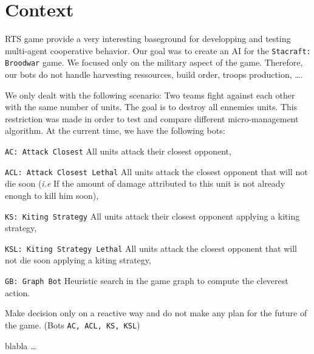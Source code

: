 \section{Context}

RTS game provide a very interesting baseground for developping and testing multi-agent cooperative behavior.
Our goal was to create an AI for the \texttt{Stacraft: Broodwar} game. We focused only on the military aspect of the game. Therefore, our bots do not handle harvesting ressources, build order, troops production, \ldots.

We only dealt with the following scenario: Two teams fight against each other with the same number of units. The goal is to destroy all ennemies units.
This restriction was made in order to test and compare different micro-management algorithm. 
At the current time, we have the following bots:
\begin{shortitem}
\item \texttt{AC: Attack Closest} All units attack their closest opponent,
\item \texttt{ACL: Attack Closest Lethal} All units attack the closest opponent that will not die soon (\emph{i.e} If the amount of damage attributed to this unit is not already enough to kill him soon),
\item \texttt{KS: Kiting Strategy} All units attack their closest opponent applying a kiting strategy,
\item \texttt{KSL: Kiting Strategy Lethal} All units attack the closest opponent that will not die soon applying a kiting strategy,
\item \texttt{GB: Graph Bot} Heuristic search in the game graph to compute the cleverest action.
\end{shortitem}

\begin{definition}
Make decision only on a reactive way and do not make any plan for the future of the game. (Bots \texttt{AC, ACL, KS, KSL})
\end{definition}

\begin{definition}
blabla \ldots
\end{definition}
